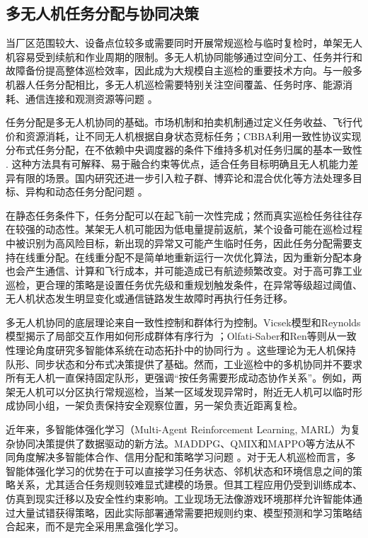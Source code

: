\subsection{多无人机任务分配与协同决策}

当厂区范围较大、设备点位较多或需要同时开展常规巡检与临时复检时，单架无人机容易受到续航和作业周期的限制。多无人机协同能够通过空间分工、任务并行和故障备份提高整体巡检效率，因此成为大规模自主巡检的重要技术方向。与一般多机器人任务分配相比，多无人机巡检需要特别关注空间覆盖、任务时序、能源消耗、通信连接和观测资源等问题
\cite{gerkey2004formal,jiagw2021review,duyh2020survey,jiayn2020recent}。

任务分配是多无人机协同的基础。市场机制和拍卖机制通过定义任务收益、飞行代价和资源消耗，让不同无人机根据自身状态竞标任务；CBBA利用一致性协议实现分布式任务分配，在不依赖中央调度器的条件下维持多机对任务归属的基本一致性
\cite{choi2009consensus}. 这种方法具有可解释、易于融合约束等优点，适合任务目标明确且无人机能力差异有限的场景。国内研究还进一步引入粒子群、博弈论和混合优化等方法处理多目标、异构和动态任务分配问题
\cite{zhaiz2023market,zhangrp2022hybrid,jukai2022task,biwh2024review,zhangkw2021survey}。

在静态任务条件下，任务分配可以在起飞前一次性完成；然而真实巡检任务往往存在较强的动态性。某架无人机可能因为低电量提前返航，某个设备可能在巡检过程中被识别为高风险目标，新出现的异常又可能产生临时任务，因此任务分配需要支持在线重分配。在线重分配不是简单地重新运行一次优化算法，因为重新分配本身也会产生通信、计算和飞行成本，并可能造成已有航迹频繁改变。对于高可靠工业巡检，更合理的策略是设置任务优先级和重规划触发条件，在异常等级超过阈值、无人机状态发生明显变化或通信链路发生故障时再执行任务迁移。

多无人机协同的底层理论来自一致性控制和群体行为控制。Vicsek模型和Reynolds模型揭示了局部交互作用如何形成群体有序行为
\cite{vicsek1995novel,reynolds1987flocks}；Olfati-Saber和Ren等则从一致性理论角度研究多智能体系统在动态拓扑中的协同行为
\cite{olfati2004consensus,ren2005consensus,olfati2006flocking}。这些理论为无人机保持队形、同步状态和分布式决策提供了基础。然而，工业巡检中的多机协同并不要求所有无人机一直保持固定队形，更强调“按任务需要形成动态协作关系”。例如，两架无人机可以分区执行常规巡检，当某一区域发现异常时，附近无人机可以临时形成协同小组，一架负责保持安全观察位置，另一架负责近距离复检。

近年来，多智能体强化学习（Multi-Agent Reinforcement Learning, MARL）为复杂协同决策提供了数据驱动的新方法。MADDPG、QMIX和MAPPO等方法从不同角度解决多智能体合作、信用分配和策略学习问题
\cite{lowe2017multi,rashid2018qmix,yu2022surprising,gronauer2022marl}。对于无人机巡检而言，多智能体强化学习的优势在于可以直接学习任务状态、邻机状态和环境信息之间的策略关系，尤其适合任务规则较难显式建模的场景。但其工程应用仍受到训练成本、仿真到现实迁移以及安全性约束影响。工业现场无法像游戏环境那样允许智能体通过大量试错获得策略，因此实际部署通常需要把规则约束、模型预测和学习策略结合起来，而不是完全采用黑盒强化学习。

